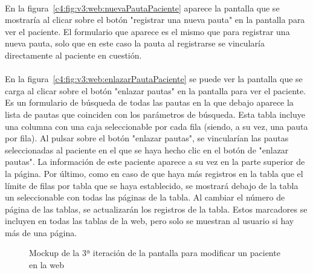 \paragraph{}
En la figura~\ref{c4:fig:v3:web:nuevaPautaPaciente} aparece la pantalla que se mostraría al clicar sobre el botón "registrar una nueva pauta" en la pantalla para ver el paciente. El formulario que aparece es el mismo que para registrar una nueva pauta, solo que en este caso la pauta al registrarse se vincularía directamente al paciente en cuestión.

\paragraph{}
En la figura~\ref{c4:fig:v3:web:enlazarPautaPaciente} se puede ver la pantalla que se carga al clicar sobre el botón "enlazar pautas" en la pantalla para ver el paciente. Es un formulario de búsqueda de todas las pautas en la que debajo aparece la lista de pautas que coinciden con los parámetros de búsqueda. Esta tabla incluye una columna con una caja seleccionable por cada fila (siendo, a su vez, una pauta por fila). Al pulsar sobre el botón "enlazar pautas", se vincularían las pautas seleccionadas al paciente en el que se haya hecho clic en el botón de "enlazar pautas". La información de este paciente aparece a su vez en la parte superior de la página. Por último, como en caso de que haya más registros en la tabla que el límite de filas por tabla que se haya establecido, se mostrará debajo de la tabla un seleccionable con todas las páginas de la tabla. Al cambiar el número de página de las tablas, se actualizarán los registros de la tabla. Estos marcadores se incluyen en todas las tablas de la web, pero solo se muestran al usuario si hay más de una página.

\begin{figure}[H]
    \centering
    \caption[Mockup de la 3ª iteración de la pantalla para modificar un paciente en la web]{Mockup de la 3ª iteración de la pantalla para modificar un paciente en la web}
    \label{c4:fig:v3:web:modificarPaciente}
\end{figure}


